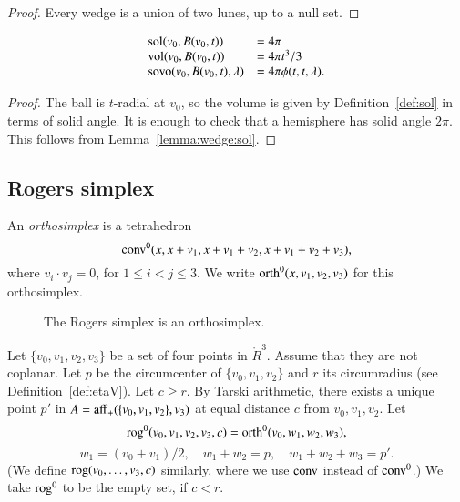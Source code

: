 \begin{proof} Every wedge is a union of two lunes, up to a null set.
\end{proof}

\begin{lemma}  
   $$
   \begin{array}{lll}
    {\operatorname{sol}}(v_0,B(v_0,t)) &= 4\pi\\
    {\operatorname{vol}}(v_0,B(v_0,t)) &= 4\pi t^3/3\\
    {\operatorname{sovo}}(v_0,B(v_0,t),\lambda) &= 4 \pi \phi(t,t,\lambda).
   \end{array}
   $$
\end{lemma}

\begin{proof}
The ball is $t$-radial at $v_0$, so the volume is given by
Definition~\ref{def:sol} in terms of solid angle.  It is enough
to check that a hemisphere has solid angle $2\pi$.  This follows
from Lemma~\ref{lemma:wedge:sol}.
\end{proof}  




\subsection{Rogers simplex}

\begin{definition} 
An {\it orthosimplex} is a tetrahedron
    $${\operatorname{conv}}^0(x,x+v_1,x+v_1+v_2,x+v_1+v_2+v_3),$$
where $v_i\cdot v_j=0$, for $1\le i<j\le 3$.   We write
${\operatorname{orth}}^0(x,v_1,v_2,v_3)$ for this orthosimplex.
\end{definition}

\begin{figure}[htb]
  \centering
  \caption{The Rogers simplex is an orthosimplex.}
\end{figure}


\begin{definition} 
Let $\{v_0,v_1,v_2,v_3\}$ be a set of four points in $\ring{R}^3$.
Assume that they are not coplanar.  Let $p$ be the circumcenter
of $\{v_0,v_1,v_2\}$ and $r$ its circumradius (see Definition~\ref{def:etaV}).  Let $c\ge r$.
By Tarski arithmetic, there exists a unique
point $p'$ in $A={\operatorname{aff}}_+(\{v_0,v_1,v_2\},v_3)$ at equal distance $c$
from $v_0,v_1,v_2$.
Let 
$$
    {\operatorname{rog}}^0(v_0,v_1,v_2,v_3,c) = 
    {\operatorname{orth}}^0(v_0,w_1,w_2,w_3),
$$
$$
     w_1=(v_0+v_1)/2,\quad w_1+w_2=p,\quad w_1+w_2+w_3=p'.
$$
(We define ${\operatorname{rog}}(v_0,\ldots,v_3,c)$ similarly, where we use
${\operatorname{conv}}$ instead of ${\operatorname{conv}}^0$.)
We take ${\operatorname{rog}}^0$ to be the empty set, if $c< r$.
\end{definition}


